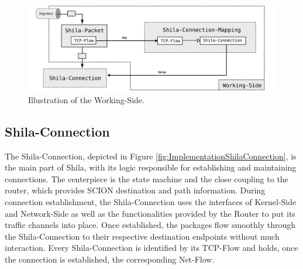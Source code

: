 \begin{figure}[H]
	\begin{center}
		\def\svgwidth{1\textwidth}
		\includegraphics[scale=0.2]{../illustrations/implementation/ProcessWorkingSide.pdf}   
		\caption[Caption for the list of figures.]{Illustration of the Working-Side.}
		\label{fig:ImplementationProcessWorkingSide}
	\end{center}
\end{figure}

\subsection{Shila-Connection}

The Shila-Connection, depicted in Figure \ref{fig:ImplementationShilaConnection}, is the main part of Shila, with its logic responsible for establishing and maintaining connections. The centerpiece is the state machine and the close coupling to the router, which provides SCION destination and path information. During connection establishment, the Shila-Connection uses the interfaces of Kernel-Side and Network-Side as well as the functionalities provided by the Router to put its traffic channels into place. Once established, the packages flow smoothly through the Shila-Connection to their respective destination endpoints without much interaction. Every Shila-Connection is identified by its TCP-Flow and holds, once the connection is established, the corresponding Net-Flow.

